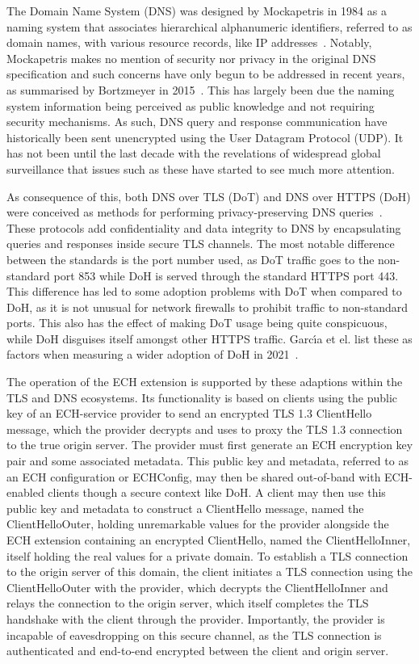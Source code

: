 \documentclass[a4paper,oneside,12pt]{article}
\begin{document}
The Domain Name System (DNS) was designed by Mockapetris in 1984 as a naming system that associates hierarchical alphanumeric identifiers, referred to as domain names, with various resource records, like IP addresses~\cite{rfc1034, rfc1035}. Notably, Mockapetris makes no mention of security nor privacy in the original DNS specification and such concerns have only begun to be addressed in recent years, as summarised by Bortzmeyer in 2015~\cite{rfc7626}. This has largely been due the naming system information being perceived as public knowledge and not requiring security mechanisms. As such, DNS query and response communication have historically been sent unencrypted using the User Datagram Protocol (UDP). It has not been until the last decade with the revelations of widespread global surveillance that issues such as these have started to see much more attention.

As consequence of this, both DNS over TLS (DoT) and DNS over HTTPS (DoH) were conceived as methods for performing privacy-preserving DNS queries~\cite{rfc7858, rfc8484}. These protocols add confidentiality and data integrity to DNS by encapsulating queries and responses inside secure TLS channels. The most notable difference between the standards is the port number used, as DoT traffic goes to the non-standard port 853 while DoH is served through the standard HTTPS port 443. This difference has led to some adoption problems with DoT when compared to DoH, as it is not unusual for network firewalls to prohibit traffic to non-standard ports. This also has the effect of making DoT usage being quite conspicuous, while DoH disguises itself amongst other HTTPS traffic. Garc{\'\i}a et el. list these as factors when measuring a wider adoption of DoH in 2021~\cite{garcia2021large}.

The operation of the ECH extension is supported by these adaptions within the TLS and DNS ecosystems. Its functionality is based on clients using the public key of an ECH-service provider to send an encrypted TLS 1.3 ClientHello message, which the provider decrypts and uses to proxy the TLS 1.3 connection to the true origin server. The provider must first generate an ECH encryption key pair and some associated metadata. This public key and metadata, referred to as an ECH configuration or ECHConfig, may then be shared out-of-band with ECH-enabled clients though a secure context like DoH. A client may then use this public key and metadata to construct a ClientHello message, named the ClientHelloOuter, holding unremarkable values for the provider alongside the ECH extension containing an encrypted ClientHello, named the ClientHelloInner, itself holding the real values for a private domain. To establish a TLS connection to the origin server of this domain, the client initiates a TLS connection using the ClientHelloOuter with the provider, which decrypts the ClientHelloInner and relays the connection to the origin server, which itself completes the TLS handshake with the client through the provider. Importantly, the provider is incapable of eavesdropping on this secure channel, as the TLS connection is authenticated and end-to-end encrypted between the client and origin server.
\end{document}
